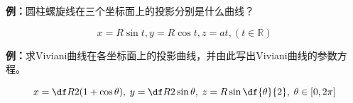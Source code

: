 {\bf 例：}圆柱螺旋线在三个坐标面上的投影分别是什么曲线？
\begin{center}
\end{center}
$$x=R\sin t, y=R\cos t, z=at,(t\in\mathbb{R})$$

{\bf 例：}求Viviani曲线在各坐标面上的投影曲线，并由此写出Viviani曲线的参数方程。
\begin{center}
\end{center}
$${x=\df R2(1+\cos\theta),\;y=\df
R2\sin\theta,\;z=R\sin\df{\theta}{2},\;\theta\in[0,2\pi]}$$

